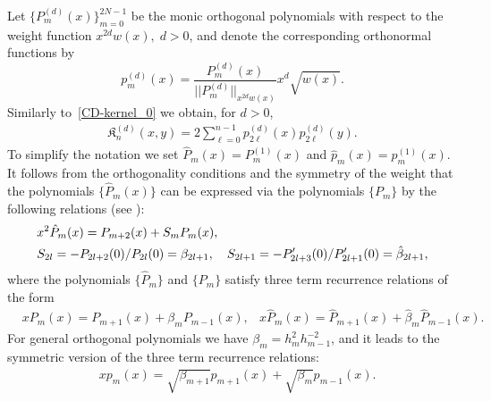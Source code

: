 \documentclass[reqno,11pt]{amsart}
\theoremstyle{plain}
\theoremstyle{definition}
\numberwithin{equation}{section}
\begin{document}
Let $\{P^{(d)}_m(x)\}_{m=0}^{2N-1}$ be the monic orthogonal polynomials with respect to the weight function $x^{2d}w(x),\;d>0$, and denote the corresponding orthonormal functions by 
$$
p^{(d)}_m(x)=\frac{P^{(d)}_m(x)}{||P^{(d)}_m||_{x^{2d}w(x)}}x^d\sqrt{w(x)}.
$$ 
Similarly to~\eqref{CD-kernel_0} we obtain, for $d>0$,
\begin{align}\label{CD-kernel_1}
	\mathfrak{K}^{(d)}_n(x,y) = 
    2\sum\limits_{\ell=0}^{n-1}p^{(d)}_{2\ell}(x) p^{(d)}_{2\ell}(y).
\end{align}
To simplify the notation we set $\hat{P}_m(x)=P^{(1)}_m(x)$ and $\hat{p}_m(x)=p^{(1)}_m(x)$.
It follows from the orthogonality conditions and the symmetry of the weight that the polynomials $\{\hat{P}_m(x)\}$ can be expressed via the polynomials $\{P_m\}$ by the following relations (see \cite[Theorem 2.7.1]{Ismail_2005}):
\begin{align} \label{hatPm_p}
	&x^2\hat{P}_m(x)=P_{m+2}(x)+S_mP_m(x),\\ \notag
	& S_{2l}=-P_{2l+2}(0)/P_{2l}(0)=\beta_{2l+1}, \quad S_{2l+1}=-P'_{2l+3}(0)/P'_{2l+1}(0)=\hat{\beta}_{2l+1},
\end{align}
where the polynomials $\{\hat{P}_m\}$ and $\{P_{m}\}$ satisfy three term recurrence relations of the form
\begin{align}\label{TTR}
  &xP_m(x)=P_{m+1}(x)+\beta_mP_{m-1}(x),
  &x\hat{P}_m(x)=\hat{P}_{m+1}(x)+\hat{\beta}_m\hat{P}_{m-1}(x).
\end{align}
For general orthogonal polynomials we have $\beta_m = h_m^2 h_{m-1}^{-2}$, and it leads to the symmetric version of the three term recurrence relations:
\begin{align}\label{TTR_sym}
  &xp_m(x) = \sqrt{\beta_{m+1}}p_{m+1}(x)+\sqrt{\beta_m} p_{m-1}(x).
\end{align}
\end{document}
